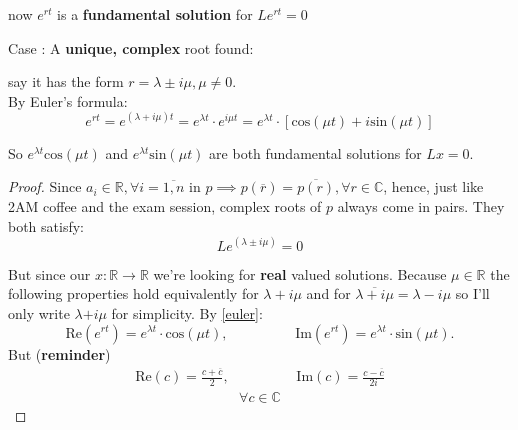 now $e^{rt}$ is a \textbf{fundamental solution} for $Le^{rt}=0$

Case : A \textbf{unique, complex} root found:

say it has the form $r = \lambda \pm i\mu, \mu \neq 0$. \\
By Euler's formula:
\begin{equation}\label{euler}
	e^{rt} = e^{(\lambda + i\mu)t} = e^{\lambda t} \cdot e^{i \mu t}  =  e^{\lambda t} \cdot [\text{cos}(\mu t) + i \text{sin}(\mu t)]
\end{equation}

So $e^{\lambda t}\text{cos}(\mu t)$ and $e^{\lambda t}\text{sin}(\mu t)$ are both fundamental solutions for $Lx=0$.

\begin{proof}
	Since $a_i \in \mathbb{R}, \forall i=\overline{1,n}$ in $p \implies p(\overline{r})=\overline{p(r)}, \forall r \in \mathbb{C}$, hence, just like 2AM coffee and the exam session, complex roots of $p$ always come in pairs. They both satisfy:
	\begin{equation}\label{lin_op_solution}
		Le^{(\lambda \pm i \mu)} = 0
	\end{equation}

	But since our $x : \mathbb{R} \rightarrow \mathbb{R}$ we're looking for \textbf{real} valued solutions.
	Because $\mu \in \mathbb{R}$ the following properties hold equivalently for $\lambda + i\mu$ and for $\overline{\lambda + i\mu}=\lambda - i\mu$ so I'll only write $\lambda \textbf{+} i \mu$ for simplicity. By \ref{euler}:
	\begin{equation}\label{eulers_real_and_imaginary}
		\text{Re}(e^{rt})=e^{\lambda t} \cdot \text{cos}(\mu t), \hspace{2cm}    \text{Im}(e^{rt}) = e^{\lambda t} \cdot \text{sin}(\mu t).
	\end{equation}
	But (\textbf{reminder})
	\begin{gather}\label{real_imag_another_way_to_write}
		\text{Re}(c)= \frac{c+\overline{c}}{2}, \hspace{2cm}
		\text{Im}(c) = \frac{c-\overline{c}}{2i}
	\end{gather}
	\begin{gather*}
		\forall c \in \mathbb{C}
	\end{gather*}

	\newcommand\firstConclusion{\stackrel{\mathclap{\normalfont\mbox{\ref{eulers_real_and_imaginary}, \ref{real_imag_another_way_to_write}}}}{=\joinrel=\joinrel=\joinrel=\joinrel=\joinrel=}}


\end{proof}
